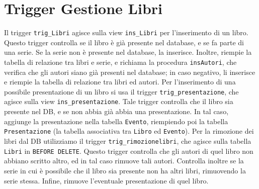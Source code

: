 \section{Trigger Gestione Libri}
Il trigger \texttt{trig\_Libri} agisce sulla view \texttt{ins\_Libri} per l'inserimento di un libro.
Questo trigger controlla se il libro \`e gi\`a presente nel database, e se fa parte di una serie. Se la 
serie non \`e presente nel database, la inserisce. Inoltre, riempie la tabella di relazione tra libri e serie, 
e richiama la procedura \texttt{insAutori}, che verifica che gli autori siano gi\`a presenti nel database; in 
caso negativo, li inserisce e riempie la tabella di relazione tra libri ed autori.
Per l'inserimento di una possibile presentazione di un libro si usa il trigger \texttt{trig\_presentazione}, 
che agisce sulla view \texttt{ins\_presentazione}. Tale trigger controlla che il libro sia presente nel DB, 
e se non abbia gi\`a abbia una presentazione. In tal caso, aggiunge la presentazione nella tabella \texttt{Evento}, 
riempiendo poi la tabella \texttt{Presentazione} (la tabella associativa tra \texttt{Libro} ed \texttt{Evento}).
Per la rimozione dei libri dal DB utilizziamo il trigger \texttt{trig\_rimozionelibri}, che agisce sulla tabella 
\texttt{Libri} in \texttt{BEFORE DELETE}. Questo trigger controlla che gli autori di quel libro non abbiano scritto 
altro, ed in tal caso rimuove tali autori. Controlla inoltre se la serie in cui \`e possibile che il libro sia presente 
non ha altri libri, rimuovendo la serie stessa. Infine, rimuove l'eventuale presentazione di quel libro.

